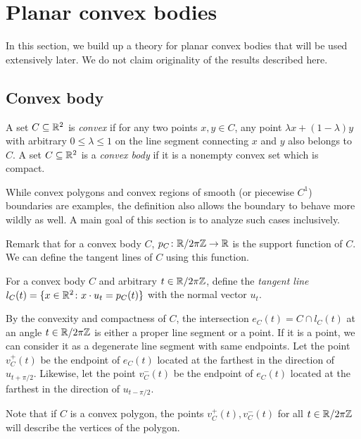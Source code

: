 \section{Planar convex bodies}

In this section, we build up a theory for planar convex bodies that will be used extensively later.
We do not claim originality of the results described here.

\subsection{Convex body}

\begin{definition}
A set $C \subseteq \mathbb{R}^2$ is \emph{convex} 
if for any two points $x, y \in C$, any point
$\lambda x + (1 - \lambda) y$ with arbitrary $0 \leq \lambda \leq 1$ on the line segment connecting $x$ and $y$ also belongs to $C$.
A set $C \subseteq \mathbb{R}^2$ is a \emph{convex body} if it is a nonempty convex set which is compact.
\end{definition}
While convex polygons and convex regions of smooth (or piecewise $C^1$) boundaries are examples, the definition also allows the boundary to behave more wildly as well. 
A main goal of this section is to analyze such cases inclusively.

Remark that for a convex body $C$, $p_C \colon \mathbb{R} / 2 \pi \mathbb{Z} \rightarrow \mathbb{R}$ is the support function of $C$.
We can define the tangent lines of $C$ using this function.
\begin{definition}
For a convex body $C$ and arbitrary $t \in \mathbb{R} / 2 \pi \mathbb{Z}$, define the \emph{tangent line} $l_C(t) = \{x \in \mathbb{R}^2 \colon x \cdot u_t = p_C(t)\}$ with the normal vector $u_t$.
\end{definition}

\begin{definition}
By the convexity and compactness of $C$, the intersection $e_C(t) = C \cap l_C(t)$ at an angle $t \in \mathbb{R} / 2 \pi \mathbb{Z}$ is either a proper line segment or a point. If it is a point, we can consider it as a degenerate line segment with same endpoints.
Let the point $v_C^+(t)$ be the endpoint of $e_C(t)$ located at the farthest in the direction of $u_{t + \pi / 2}$.
Likewise, let the point $v_C^-(t)$ be the endpoint of $e_C(t)$ located at the farthest in the direction of $u_{t - \pi / 2}$.
\end{definition}
Note that if $C$ is a convex polygon, the points $v_C^+(t), v_C^-(t)$ for all $t \in \mathbb{R} / 2 \pi \mathbb{Z}$ will describe the vertices of the polygon. 


